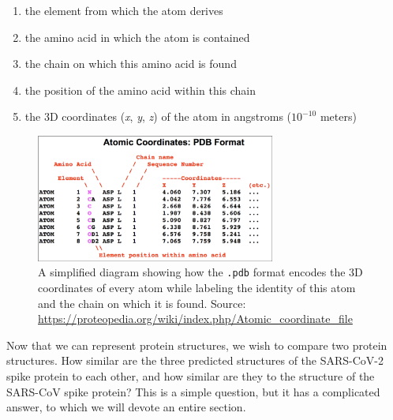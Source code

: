 \begin{enumerate}
	\item the element from which the atom derives \\
	\item the amino acid in which the atom is contained \\
	\item the chain on which this amino acid is found \\
	\item the position of the amino acid within this chain \\
	\item the 3D coordinates (\textit{x}, \textit{y}, \textit{z}) of the atom in angstroms ($10^{-10}$ meters) \\
\end{enumerate}

\begin{figure}[h]
	\centering
	\mySfFamily
	\includegraphics[width = 0.7\textwidth]{../images/simplifiedPDB.png}
	\caption{A simplified diagram showing how the \texttt{.pdb} format encodes the 3D coordinates of every atom while labeling the identity of this atom and the chain on which it is found. Source: \url{https://proteopedia.org/wiki/index.php/Atomic_coordinate_file}}
	\label{fig:simplifiedPDB}
\end{figure}

\begin{note}\end{note}

Now that we can represent protein structures, we wish to compare two protein structures. How similar are the three predicted structures of the SARS-CoV-2 spike protein to each other, and how similar are they to the structure of the SARS-CoV spike protein? This is a simple question, but it has a complicated answer, to which we will devote an entire section.

